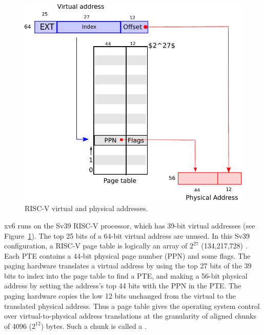 \begin{figure}[t]
\center
\includegraphics[scale=0.5]{fig/riscv_address.pdf}
\caption{RISC-V virtual and physical addresses.}
\label{fig:riscv_address}
\end{figure}

xv6 runs on the Sv39 RISC-V processor, which has 39-bit virtual
addresses (see Figure~\ref{fig:riscv_address}). The top 25 bits of a
64-bit virtual address are unused.  In this Sv39 configuration, a
RISC-V page table is logically an array of $2^{27}$ (134,217,728)
.  Each PTE contains a 44-bit
physical page number (PPN) and some flags. The paging hardware
translates a virtual address by using the top 27 bits of the 39 bits
to index into the page table to find a PTE, and making a 56-bit
physical address by setting the address's top 44 bits with the PPN in
the PTE.  The paging hardware copies the low 12 bits unchanged from
the virtual to the translated physical address.  Thus a page table
gives the operating system control over virtual-to-physical address
translations at the granularity of aligned chunks of 4096 ($2^{12}$)
bytes.  Such a chunk is called a .

